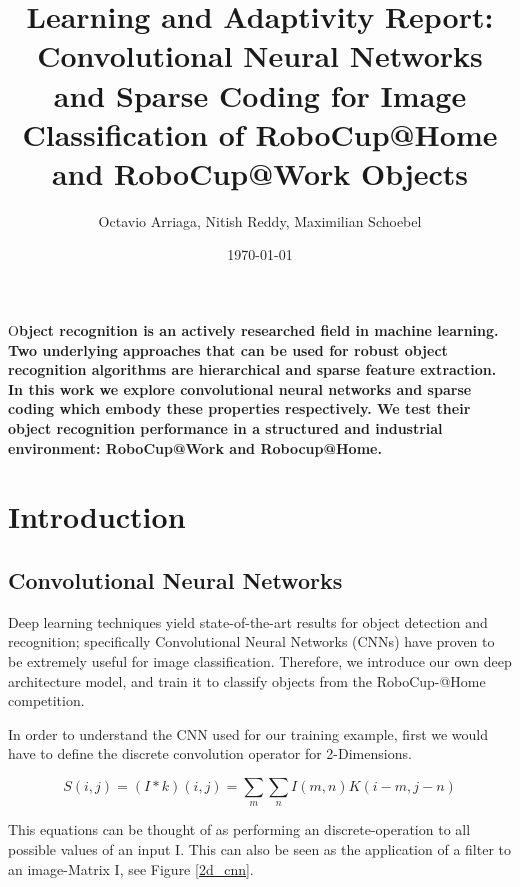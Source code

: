 \documentclass[	DIV=calc,%
				paper=a4,%
				fontsize=11pt,%
				twocolumn]{scrartcl}	 %
\title{Learning and Adaptivity Report:
\\Convolutional Neural Networks and Sparse Coding for Image Classification of RoboCup@Home and RoboCup@Work Objects}%
\author{Octavio Arriaga, Nitish Reddy, Maximilian Schoebel   }	%
\date{\today}
\newcommand{\initial}[1]{%
     \lettrine[lines=3,lhang=0.3,nindent=0em]{
     				\color{brsublue}
     				{\textsf{#1}}}{}}
\begin{document}
\maketitle
\thispagestyle{fancy} %
\initial{O}\textbf{bject recognition is an actively researched field in machine learning. Two underlying approaches that can be used for robust object recognition algorithms are hierarchical and sparse feature extraction. In this work we explore convolutional neural networks and sparse coding which embody these properties respectively. We test their object recognition performance in a structured and industrial environment: RoboCup@Work and Robocup@Home.}

\section{Introduction}

\subsection*{Convolutional Neural Networks}

Deep learning techniques yield state-of-the-art results for object detection and recognition; specifically Convolutional Neural Networks (CNNs) have proven to be extremely useful for image classification. Therefore, we introduce our own deep architecture model, and train it to classify objects from the RoboCup-@Home competition.

In order to understand the CNN used for our training example, first we would have to define the discrete convolution operator for 2-Dimensions. 

\begin{equation}
S(i,j) = (I * k)(i,j) = \sum_m \sum_n I(m,n)K(i-m,j-n)
\end{equation}

This equations can be thought of as performing an discrete-operation to all possible values of an input I. This can also be seen as the application of a filter to an image-Matrix I, see Figure \ref{2d_cnn}.
\end{document}

